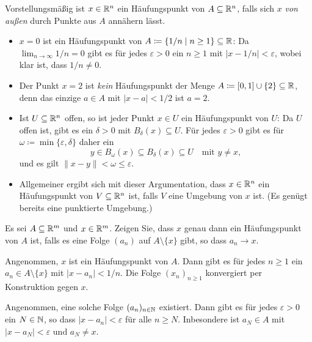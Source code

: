 \documentclass[a4paper,10pt]{article}
\begin{document}
Vorstellungsmäßig ist $x \in \mathbb{R}^n$ ein Häufungspunkt von $A \subseteq \mathbb{R}^n$, falls sich $x$ \emph{von außen} durch Punkte aus $A$ annähern lässt.


\begin{bsp}
 \begin{itemize}
  \item
   $x = 0$ ist ein Häufungspunkt von $A \coloneqq \{1/n \mid n \geq 1\} \subseteq \mathbb{R}$: Da $\lim_{n \to \infty} 1/n = 0$ gibt es für jedes $\varepsilon > 0$  ein $n \geq 1$ mit $|x-1/n| < \varepsilon$, wobei klar ist, dass $1/n \neq 0$.
  \item
   Der Punkt $x = 2$ ist \emph{kein} Häufungspunkt der Menge $A \coloneqq [0,1] \cup \{2\} \subseteq \mathbb{R}$, denn das einzige $a \in A$ mit $|x-a| < 1/2$ ist $a = 2$.
  \item
   Ist $U \subseteq \mathbb{R}^n$ offen, so ist jeder Punkt $x \in U$ ein Häufungspunkt von $U$: Da $U$ offen ist, gibt es ein $\delta > 0$ mit $B_\delta(x) \subseteq U$. Für jedes $\varepsilon > 0$ gibt es für $\omega \coloneqq \min\{\varepsilon,\delta\}$ daher ein
   \[
    y \in B_\omega(x) \subseteq B_\delta(x) \subseteq U \quad \text{mit $y \neq x$},
   \]
   und es gilt $\|x-y\| < \omega \leq \varepsilon$.
  \item
   Allgemeiner ergibt sich mit dieser Argumentation, dass $x \in \mathbb{R}^n$ ein Häufungspunkt von $V \subseteq \mathbb{R}^n$ ist, falls $V$ eine Umgebung von $x$ ist. (Es genügt bereits eine punktierte Umgebung.)
 \end{itemize}
\end{bsp}


\begin{question}
 Es sei $A \subseteq \mathbb{R}^m$ und $x \in \mathbb{R}^m$. Zeigen Sie, dass $x$ genau dann ein Häufungspunkt von $A$ ist, falls es eine Folge $(a_n)$ auf $A \setminus \{x\}$ gibt, so dass $a_n \to x$.
\end{question}
\begin{solution}
 Angenommen, $x$ ist ein Häufungspunkt von $A$. Dann gibt es für jedes $n \geq 1$ ein $a_n \in A \setminus \{x\}$ mit $|x-a_n| < 1/n$. Die Folge $(x_n)_{n \geq 1}$ konvergiert per Konstruktion gegen $x$.
 
 Angenommen, eine solche Folge $(a_n)_{n \in \mathbb{N}}$ existiert. Dann gibt es für jedes $\varepsilon > 0$ ein $N \in \mathbb{N}$, so dass $|x-a_n| < \varepsilon$ für alle $n \geq N$. Inbesondere ist $a_N \in A$ mit $|x-a_N| < \varepsilon$ und $a_N \neq x$.
\end{solution}
\end{document}
